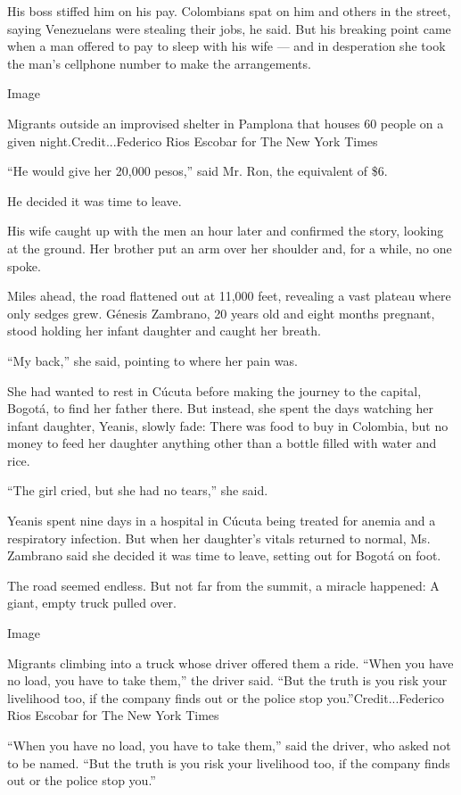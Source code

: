 His boss stiffed him on his pay. Colombians spat on him and others in
the street, saying Venezuelans were stealing their jobs, he said. But
his breaking point came when a man offered to pay to sleep with his wife
--- and in desperation she took the man's cellphone number to make the
arrangements.

Image

Migrants outside an improvised shelter in Pamplona that houses 60 people
on a given night.Credit...Federico Rios Escobar for The New York Times

``He would give her 20,000 pesos,'' said Mr. Ron, the equivalent of \$6.

He decided it was time to leave.

His wife caught up with the men an hour later and confirmed the story,
looking at the ground. Her brother put an arm over her shoulder and, for
a while, no one spoke.

Miles ahead, the road flattened out at 11,000 feet, revealing a vast
plateau where only sedges grew. Génesis Zambrano, 20 years old and eight
months pregnant, stood holding her infant daughter and caught her
breath.

``My back,'' she said, pointing to where her pain was.

She had wanted to rest in Cúcuta before making the journey to the
capital, Bogotá, to find her father there. But instead, she spent the
days watching her infant daughter, Yeanis, slowly fade: There was food
to buy in Colombia, but no money to feed her daughter anything other
than a bottle filled with water and rice.

``The girl cried, but she had no tears,'' she said.

Yeanis spent nine days in a hospital in Cúcuta being treated for anemia
and a respiratory infection. But when her daughter's vitals returned to
normal, Ms. Zambrano said she decided it was time to leave, setting out
for Bogotá on foot.

The road seemed endless. But not far from the summit, a miracle
happened: A giant, empty truck pulled over.

Image

Migrants climbing into a truck whose driver offered them a ride. ``When
you have no load, you have to take them,'' the driver said. ``But the
truth is you risk your livelihood too, if the company finds out or the
police stop you.''Credit...Federico Rios Escobar for The New York Times

``When you have no load, you have to take them,'' said the driver, who
asked not to be named. ``But the truth is you risk your livelihood too,
if the company finds out or the police stop you.''

